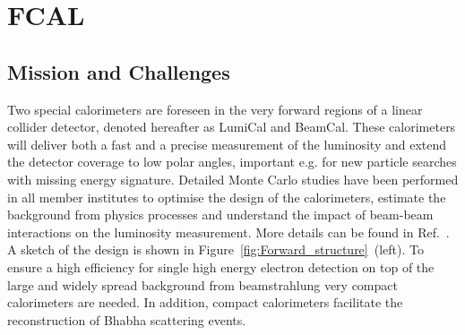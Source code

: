\section{FCAL}
\subsection{Mission and Challenges}
Two special calorimeters are foreseen in the very forward regions of a linear collider detector, denoted hereafter as
LumiCal and BeamCal.
These calorimeters will deliver both a fast and a precise measurement of the luminosity
and extend the detector coverage to low polar angles,
important e.g. for new particle searches with missing energy signature.
Detailed Monte Carlo studies have been performed in all member institutes to
optimise the design of the calorimeters, estimate the background from physics processes and understand the impact
of beam-beam interactions on the luminosity measurement.
More details can be found in Ref.~\cite{2010JInst...512002A}.
A sketch of the design is shown in Figure~\ref{fig:Forward_structure}~(left).
To ensure a high efficiency for single high energy electron detection on top of the large and widely spread
background from beamstrahlung very compact calorimeters are needed. In addition, compact calorimeters facilitate
the reconstruction of Bhabha scattering events.
